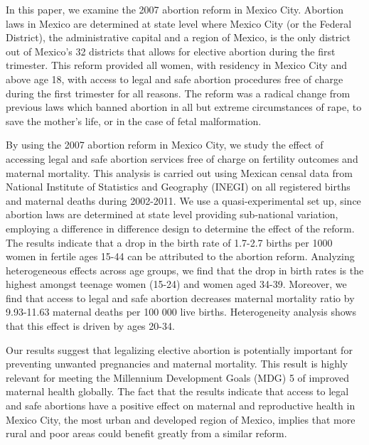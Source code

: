 \documentclass[a4paper, 11pt]{article}
\begin{document}
\begin{spacing}{1.5}
\begin{multicols}{2}
 In this paper, we examine the 2007 abortion reform in Mexico City. Abortion laws in Mexico are determined at state level where Mexico City (or the Federal District), the administrative capital and a region of Mexico, is the only district out of Mexico's 32 districts that allows for elective abortion during the first trimester. This reform provided all women, with residency in Mexico City and above age 18, with access to legal and safe abortion procedures free of charge during the first trimester for all reasons. The reform was a radical change from previous laws which banned abortion in all but extreme circumstances of rape, to save the mother’s life, or in the case of fetal malformation. 
 
 By using the 2007 abortion reform in Mexico City, we study the effect of accessing legal and safe abortion services free of charge on fertility outcomes and maternal mortality. This analysis is carried out using Mexican censal data from National Institute of Statistics and Geography (INEGI) on all registered births and maternal deaths during 2002-2011. We use a quasi-experimental set up, since abortion laws are determined at state level providing sub-national variation, employing a difference in difference design to determine the effect of the reform. The results indicate that a drop in the birth rate of 1.7-2.7 births per 1000 women in fertile ages 15-44 can be attributed to the abortion reform. Analyzing heterogeneous effects across age groups, we find that the drop in birth rates is the highest amongst teenage women (15-24) and women aged 34-39. Moreover, we find that access to legal and safe abortion decreases maternal mortality ratio by 9.93-11.63 maternal deaths per 100 000 live births. Heterogeneity analysis shows that this effect is driven by ages 20-34. 
 
 Our results suggest that legalizing elective abortion is potentially important for preventing unwanted pregnancies and maternal mortality. This result is highly relevant for meeting the Millennium Development Goals (MDG) 5 of improved maternal health globally. The fact that the results indicate that access to legal and safe abortions have a positive effect on maternal and reproductive health in Mexico City, the most urban and developed region of Mexico, implies that more rural and poor areas could benefit greatly from a similar reform.        

\end{multicols}
\end{spacing}
\end{document}
